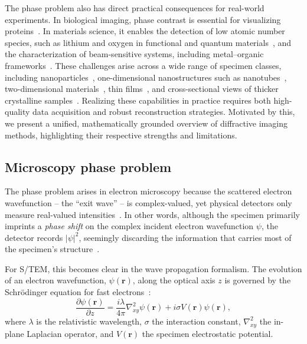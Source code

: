 \documentclass[pdflatex,sn-aps,iicol]{sn-jnl}%
\begin{document}
The phase problem also has direct practical consequences for real-world experiments.
In biological imaging, phase contrast is essential for visualizing proteins~\cite{Berk_2024,Yu_2025,Spoth_2017}.
In materials science, it enables the detection of low atomic number species, such as lithium and oxygen in functional and quantum materials~\cite{lozano2018low,kp2025electron}, and the characterization of beam-sensitive systems, including metal–organic frameworks~\cite{shen2020imaging, Li_2025, Ma_2025}.
These challenges arise across a wide range of specimen classes, including nanoparticles~\cite{shi2025electron,Ribet_2024,Varnavides_2023}, one-dimensional nanostructures such as nanotubes~\cite{yang2016simultaneous,pelz2023solving}, two-dimensional materials~\cite{jiang2018electron,o2022increasing,Susi_2025,byrne2025fabrication,zhang2025atom}, thin films~\cite{dong2025sub}, and cross-sectional views of thicker crystalline samples~\cite{scheid2025atomic,chen2024imaging}.
Realizing these capabilities in practice requires both high-quality data acquisition and robust reconstruction strategies.
Motivated by this, we present a unified, mathematically grounded overview of diffractive imaging methods, highlighting their respective strengths and limitations.

\subsection*{Microscopy phase problem}

The phase problem arises in electron microscopy because the scattered electron wavefunction -- the ``exit wave'' -- is complex-valued, yet physical detectors only measure real-valued intensities~\cite{Fienup_1982}.
In other words, although the specimen primarily imprints a \emph{phase shift} on the complex incident electron wavefunction $\psi$, the detector records $|\psi|^2$, seemingly discarding the information that carries most of the specimen's structure~\cite{born1954}.

For S/TEM, this becomes clear in the wave propagation formalism.
The evolution of an electron wavefunction, $\psi(\boldsymbol{r})$, along the optical axis $z$ is governed by the Schr\"odinger equation for fast electrons~\cite{Kirkland_2020}:
\begin{equation}
  \frac{\partial \psi(\boldsymbol{r})}{\partial z} = \frac{i \lambda}{4\pi}\nabla_{xy}^2 \psi(\boldsymbol{r})
  + i \sigma V(\boldsymbol{r}) \psi(\boldsymbol{r}),
  \label{eq:schrodinger}
\end{equation}
where $\lambda$ is the relativistic wavelength, $\sigma$ the interaction constant, $\nabla_{xy}^2$ the in-plane Laplacian operator, and $V(\boldsymbol{r})$ the specimen electrostatic potential.
\end{document}
